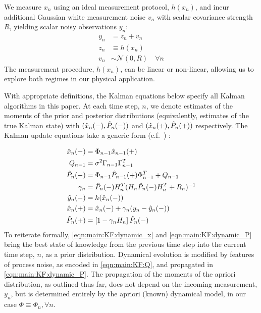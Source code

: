 \documentclass[pra, reprint]{revtex4-1}
\begin{document}
We measure $x_n$ using an ideal measurement protocol, $h(x_n)$, and incur additional Gaussian white measurement noise $v_n$ with scalar covariance strength $R$, yielding scalar noisy observations $y_n$:
\begin{align}
y_n &= z_n + v_n \\
z_n & \equiv  h(x_n) \\
v_n & \sim \mathcal{N}(0, R) \quad \forall n
\end{align}
The measurement procedure, $h(x_n)$, can be linear or non-linear, allowing us to explore both regimes in our physical application.

With appropriate definitions, the Kalman equations below specify all Kalman algorithms in this paper. At each time step, $n$, we denote estimates of the moments of the prior and posterior distributions (equivalently, estimates of the true Kalman state) with $(\hat{x}_{n}(-), \hat{P}_{n}(-))$ and $(\hat{x}_{n}(+), \hat{P}_{n}(+))$ respectively. The Kalman update equations take a generic form (c.f.~\cite{grewal2001theory}) :

\begin{align}
\hat{x}_{n}(-) & = \Phi_{n-1} \hat{x}_{n-1}(+) \label{eqn:main:KF:dynamic_x}\\ 
Q_{n-1} & = \sigma^2 \Gamma_{n-1}\Gamma_{n-1}^T  \label{eqn:main:KF:Q}\\
\hat{P}_{n}(-)&= \Phi_{n-1} \hat{P}_{n-1}(+) \Phi_{n-1}^T + Q_{n-1} \label{eqn:main:KF:dynamic_P}\\
\gamma_n &= \hat{P}_{n}(-) H_n^T(H_n\hat{P}_{n}(-)H_n^T + R_n)^{-1} \label{eqn:main:KF:gain}\\
\hat{y}_n(-) & = h(\hat{x}_{n}(-)) \label{eqn:main:KF:step_ahead}\\
\hat{x}_{n}(+) &= \hat{x}_{n}(-) + \gamma_n (y_n - \hat{y}_n(-)) \label{eqn:main:KF:bayesian_x}\\
\hat{P}_{n}(+) &= \left[1  - \gamma_n H_n \right] \hat{P}_{n}(-) \label{eqn:main:KF:bayesian_p}
\end{align}
To reiterate formally, \cref{eqn:main:KF:dynamic_x} and \cref{eqn:main:KF:dynamic_P} bring the best state of knowledge from the previous time step into the current time step, $n$, as a prior distribution. Dynamical evolution is modified by features of process noise, as encoded in \cref{eqn:main:KF:Q}, and propagated in \cref{eqn:main:KF:dynamic_P}. The propagation of the moments of the apriori distribution, as outlined thus far, does not depend on the incoming measurement, $y_n$, but is determined entirely by the apriori (known) dynamical model, in our case $\Phi \equiv \Phi_n, \forall n$. 
\end{document}
